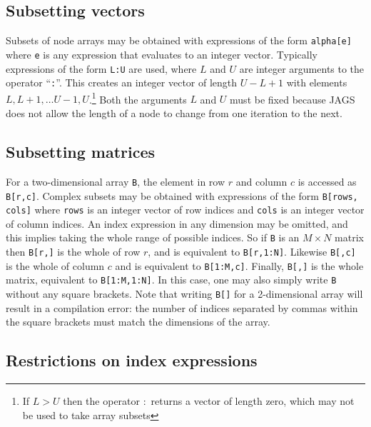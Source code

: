 \documentclass[11pt, a4paper, titlepage]{report}
\begin{document}
\subsection{Subsetting vectors}

Subsets of node arrays may be obtained with expressions of the form
\verb+alpha[e]+ where \verb+e+ is any expression that evaluates to an
integer vector. Typically expressions of the form \verb+L:U+ are used,
where $L$ and $U$ are integer arguments to the operator ``\texttt{:}''. This
creates an integer vector of length $U - L + 1$ with elements $L, L+1,
\ldots U-1, U$.\footnote{If $L > U$ then the operator $:$ returns a
  vector of length zero, which may not be used to take array subsets}
Both the arguments $L$ and $U$ must be fixed because JAGS does not
allow the length of a node to change from one iteration to the next.

\subsection{Subsetting matrices}

For a two-dimensional array \verb+B+, the element in row $r$ and
column $c$ is accessed as \verb+B[r,c]+. Complex subsets may be
obtained with expressions of the form \verb+B[rows, cols]+ where
\verb+rows+ is an integer vector of row indices and \verb+cols+ is an
integer vector of column indices.  An index expression in any
dimension may be omitted, and this implies taking the whole range of
possible indices. So if \verb+B+ is an $M \times N$ matrix then
\verb+B[r,]+ is the whole of row $r$, and is equivalent to
\verb+B[r,1:N]+. Likewise \verb+B[,c]+ is the whole of column $c$ and
is equivalent to \verb+B[1:M,c]+. Finally, \verb+B[,]+ is the whole
matrix, equivalent to \verb+B[1:M,1:N]+. In this case, one may also
simply write \verb+B+ without any square brackets. Note that writing
\verb+B[]+ for a 2-dimensional array will result in a compilation
error: the number of indices separated by commas within the square
brackets must match the dimensions of the array.

\subsection{Restrictions on index expressions}
\end{document}
